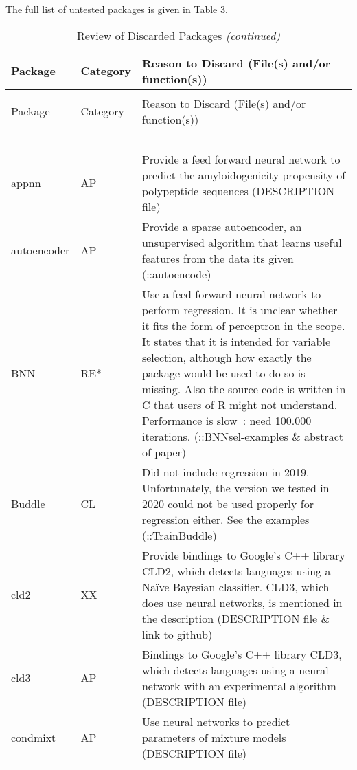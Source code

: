 The full list of untested packages is given in Table 3.

\begin{Schunk}
\begingroup\fontsize{7}{9}\selectfont

\begin{longtable}[t]{ll>{\raggedright\arraybackslash}p{10cm}}
\caption{\label{tab:unnamed-chunk-4}Review of Discarded Packages}\\
\toprule
Package & Category & Reason to Discard (File(s) and/or function(s))\\
\midrule
\endfirsthead
\caption[]{Review of Discarded Packages \textit{(continued)}}\\
\toprule
Package & Category & Reason to Discard (File(s) and/or function(s))\\
\midrule
\endhead
\
\endfoot
\bottomrule
\multicolumn{3}{l}{\textit{Note: } AP=Application, CL=Classification, RE=Regression, RE*=?, TS=Time serie, UT=Utility, XX=Other.}\\
\endlastfoot
appnn & AP & Provide a feed forward neural network to predict the amyloidogenicity propensity of polypeptide sequences (DESCRIPTION file)\\
autoencoder & AP & Provide a sparse autoencoder, an unsupervised algorithm that learns useful features from the data its given (::autoencode)\\
BNN & RE* & Use a feed forward neural network to perform regression. It is unclear whether it fits the form of perceptron in the scope. It states that it is intended for variable selection, although how exactly the package would be used to do so is missing. Also the source code is written in C that users of R might not understand. Performance is slow : need 100.000 iterations. (::BNNsel-examples \& abstract of paper)\\
Buddle & CL & Did not include regression in 2019. Unfortunately, the version we tested in 2020 could not be used properly for regression either. See the examples (::TrainBuddle)\\
cld2 & XX & Provide bindings to Google's C++ library CLD2, which detects languages using a Naïve Bayesian classifier. CLD3, which does use neural networks, is mentioned in the description (DESCRIPTION file \& link to github)\\
\addlinespace
cld3 & AP & Bindings to Google's C++ library CLD3, which detects languages using a neural network with an experimental algorithm (DESCRIPTION file)\\
condmixt & AP & Use neural networks to predict parameters of mixture models (DESCRIPTION file)\\

\end{longtable}
\end{Schunk}
